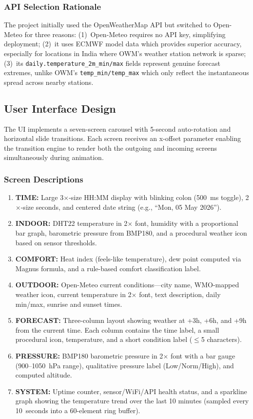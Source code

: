 \documentclass[conference]{IEEEtran}
\begin{document}
\subsubsection{API Selection Rationale}

The project initially used the OpenWeatherMap API but switched to Open-Meteo for three reasons: (1)~Open-Meteo requires no API key, simplifying deployment; (2)~it uses ECMWF model data which provides superior accuracy, especially for locations in India where OWM's weather station network is sparse; (3)~its \texttt{daily.temperature\_2m\_min/max} fields represent genuine forecast extremes, unlike OWM's \texttt{temp\_min/temp\_max} which only reflect the instantaneous spread across nearby stations.

\subsection{User Interface Design}

The UI implements a seven-screen carousel with 5-second auto-rotation and horizontal slide transitions. Each screen receives an x-offset parameter enabling the transition engine to render both the outgoing and incoming screens simultaneously during animation.

\subsubsection{Screen Descriptions}

\begin{enumerate}
    \item \textbf{TIME:} Large 3$\times$-size HH:MM display with blinking colon (500~ms toggle), 2$\times$-size seconds, and centered date string (e.g., ``Mon, 05 May 2026'').
    \item \textbf{INDOOR:} DHT22 temperature in 2$\times$ font, humidity with a proportional bar graph, barometric pressure from BMP180, and a procedural weather icon based on sensor thresholds.
    \item \textbf{COMFORT:} Heat index (feels-like temperature), dew point computed via Magnus formula, and a rule-based comfort classification label.
    \item \textbf{OUTDOOR:} Open-Meteo current conditions---city name, WMO-mapped weather icon, current temperature in 2$\times$ font, text description, daily min/max, sunrise and sunset times.
    \item \textbf{FORECAST:} Three-column layout showing weather at +3h, +6h, and +9h from the current time. Each column contains the time label, a small procedural icon, temperature, and a short condition label ($\leq$5 characters).
    \item \textbf{PRESSURE:} BMP180 barometric pressure in 2$\times$ font with a bar gauge (900--1050~hPa range), qualitative pressure label (Low/Norm/High), and computed altitude.
    \item \textbf{SYSTEM:} Uptime counter, sensor/WiFi/API health status, and a sparkline graph showing the temperature trend over the last 10 minutes (sampled every 10~seconds into a 60-element ring buffer).
\end{enumerate}
\end{document}
